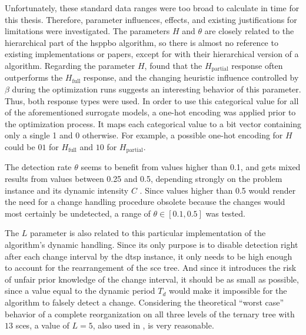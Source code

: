 Unfortunately, these standard data ranges were too broad to calculate in time for this thesis. Therefore, parameter influences, effects, and existing justifications for limitations were investigated.
The parameters $H$ and $\theta$ are closely related to the hierarchical part of the \gls{hsppbo} algorithm, so there is almost no reference to existing implementations or papers, except for \citet{janson2006hierarchical} with their hierarchical version of a  algorithm. Regarding the parameter $H$, \citet{kupfer2021hierarchical} found that the $H_{\text{partial}}$ response often outperforms the $H_{\text{full}}$ response, and the changing heuristic influence controlled by $\beta$ during the optimization runs suggests an interesting behavior of this parameter. Thus, both response types were used. In order to use this categorical value for all of the aforementioned surrogate models, a one-hot encoding was applied prior to the optimization process. It maps each categorical value to a bit vector containing only a single 1 and 0 otherwise. For example, a possible one-hot encoding for $H$ could be $01$ for $H_{\text{full}}$ and $10$ for $H_{\text{partial}}$.

The detection rate $\theta$ seems to benefit from values higher than 0.1, and gets mixed results from values between 0.25 and 0.5, depending strongly on the problem instance and its dynamic intensity $C$ \cite{kupfer2021hierarchical}. Since values higher than 0.5 would render the need for a change handling procedure obsolete because the changes would most certainly be undetected, a range of $\theta \in [0.1, 0.5]$ was tested. 

The $L$ parameter is also related to this particular implementation of the algorithm's dynamic handling. Since its only purpose is to disable detection right after each change interval by the \gls{dtsp} instance, it only needs to be high enough to account for the rearrangement of the \gls{sce} tree. And since it introduces the risk of unfair prior knowledge of the change interval, it should be as small as possible, since a value equal to the dynamic period $T_{d}$ would make it impossible for the algorithm to falsely detect a change. Considering the theoretical \enquote{worst case} behavior of a complete reorganization on all three levels of the ternary tree with $13$ \glspl{sce}, a value of $L = 5$, also used in \cite{kupfer2021hierarchical}, is very reasonable.

